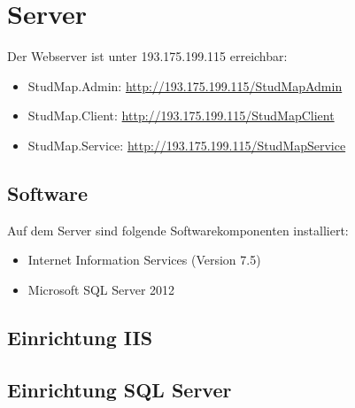 \chapter{Server}
Der Webserver ist unter 193.175.199.115 erreichbar:

\begin{itemize}
\item StudMap.Admin: \href{http://193.175.199.115/StudMapAdmin}{http://193.175.199.115/StudMapAdmin}
\item StudMap.Client: \href{http://193.175.199.115/StudMapClient}{http://193.175.199.115/StudMapClient}
\item StudMap.Service: \href{http://193.175.199.115/StudMapService}{http://193.175.199.115/StudMapService}
\end{itemize}


\section{Software}
Auf dem Server sind folgende Softwarekomponenten installiert:
\begin{itemize}
\item Internet Information Services (Version 7.5)
\item Microsoft SQL Server 2012
\end{itemize}

\section{Einrichtung IIS}

\section{Einrichtung SQL Server}

